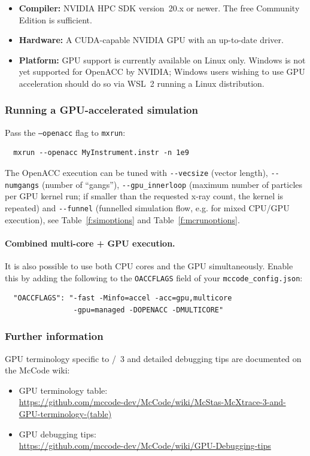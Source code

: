 \begin{itemize}
  \item \textbf{Compiler:} NVIDIA HPC SDK version~20.x or newer.  The
        free Community Edition is sufficient.
  \item \textbf{Hardware:} A CUDA-capable NVIDIA GPU with an up-to-date
        driver.
  \item \textbf{Platform:} GPU support is currently available on Linux
        only.  Windows is not yet supported for OpenACC by NVIDIA; Windows
        users wishing to use GPU acceleration should do so via
        WSL~2 running a Linux distribution.
\end{itemize}

\subsubsection{Running a GPU-accelerated simulation}

Pass the \texttt{--openacc} flag to \texttt{mxrun}:
\begin{verbatim}
  mxrun --openacc MyInstrument.instr -n 1e9
\end{verbatim}
The OpenACC execution can be tuned with \verb+--vecsize+ (vector length),
\verb+--numgangs+ (number of ``gangs''), \verb+--gpu_innerloop+ (maximum number
of particles per GPU kernel run; if smaller than the requested x-ray count,
the kernel is repeated) and \verb+--funnel+ (funnelled simulation flow, e.g.
for mixed CPU/GPU execution), see Table~\ref{f:simoptions} and
Table~\ref{f:mcrunoptions}.

\paragraph{Combined multi-core + GPU execution.}
It is also possible to use both CPU cores and the GPU simultaneously.
Enable this by adding the following to the \texttt{OACCFLAGS} field of
your \texttt{mccode\_config.json}:
\begin{verbatim}
  "OACCFLAGS": "-fast -Minfo=accel -acc=gpu,multicore
                -gpu=managed -DOPENACC -DMULTICORE"
\end{verbatim}

\subsubsection{Further information}

GPU terminology specific to \MCS/\MCX~3 and detailed debugging
tips are documented on the McCode wiki:
\begin{itemize}
  \item GPU terminology table:\\
    \url{https://github.com/mccode-dev/McCode/wiki/McStas-McXtrace-3-and-GPU-terminology-(table)}
  \item GPU debugging tips:\\
    \url{https://github.com/mccode-dev/McCode/wiki/GPU-Debugging-tips}
\end{itemize}



